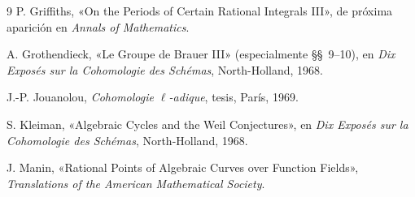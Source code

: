 \begin{thebibliography}{9}
P. Griffiths, «On the Periods of Certain Rational Integrals III», de
próxima aparición en \emph{Annals of Mathematics}.

A. Grothendieck, «Le Groupe de Brauer III» (especialmente
\S\S~9--10), en \emph{Dix Exposés sur la Cohomologie des Schémas},
North-Holland, 1968.

J.-P. Jouanolou, \emph{Cohomologie $\ell$-adique}, tesis, París, 1969.

S. Kleiman, «Algebraic Cycles and the Weil Conjectures», en
\emph{Dix Exposés sur la Cohomologie des Schémas}, North-Holland, 1968.

J. Manin, «Rational Points of Algebraic Curves over Function Fields»,
\emph{Translations of the American Mathematical Society}.
\end{thebibliography}
